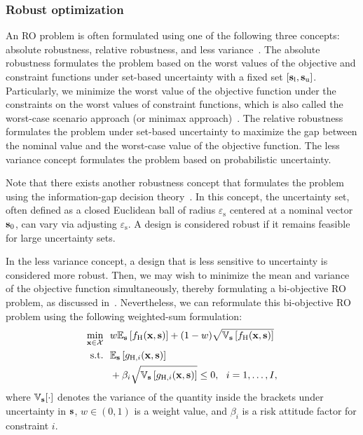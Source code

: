 \documentclass[iicol,sn-basic]{sn-jnl}%
\begin{document}
\subsubsection{Robust optimization}\label{Sec631}

An RO problem is often formulated using one of the following three concepts: absolute robustness, relative robustness, and less variance~\citep{Kanno2020}.
The absolute robustness formulates the problem based on the worst values of the objective and constraint functions under set-based uncertainty with a fixed set $[{\bf s}_\text{l},{\bf s}_\text{u}]$.
Particularly, we minimize the worst value of the objective function under the constraints on the worst values of constraint functions, which is also called the worst-case scenario approach (or minimax approach)~\citep[see e.g.,][]{BenTal2009,Elishakoff2010}.
The relative robustness formulates the problem under set-based uncertainty to maximize the gap between the nominal value and the worst-case value of the objective function.
The less variance concept formulates the problem based on probabilistic uncertainty.

Note that there exists another robustness concept that formulates the problem using the information-gap decision theory~\citep{Hemez2004}.
In this concept, the uncertainty set, often defined as a closed Euclidean ball of radius $\varepsilon_\text{s}$ centered at a nominal vector ${\bf s}_0$, can vary via adjusting $\varepsilon_\text{s}$.  
A design is considered robust if it remains feasible for large uncertainty sets.

In the less variance concept, a design that is less sensitive to uncertainty is considered more robust.
Then, we may wish to minimize the mean and variance of the objective function simultaneously, thereby formulating a
bi-objective RO problem, as discussed in~.
Nevertheless, we can reformulate this bi-objective RO problem using the following weighted-sum formulation:
\begin{equation}\label{eqn66}
	\begin{aligned}
		\underset{{\bf x} \in \mathcal{X}}{\min} \ \ & w \mathbb{E}_{\bf s}\left[f_\text{H}({\bf x},{\bf s})\right]+(1-w)\sqrt{\mathbb{V}_{\bf s}\left[f_\text{H}({\bf x},{\bf s})\right]}\\
		\textrm{s.t.} \ \ 
		& \mathbb{E}_{\bf s}\left[g_{\text{H},i}({\bf x},{\bf s})\right] \\
		& + \beta_i \sqrt{\mathbb{V}_{\bf s}\left[g_{\text{H},i}({\bf x},{\bf s})\right]} \leq 0, \ \ i=1,\dots,I, 
	\end{aligned}
\end{equation}
where $\mathbb{V}_{\bf s}[\cdot]$ denotes the variance of the quantity inside the brackets under uncertainty in ${\bf s}$, $w \in (0,1)$ is a weight value, and $\beta_i$ is a risk attitude factor for constraint $i$.
\end{document}
